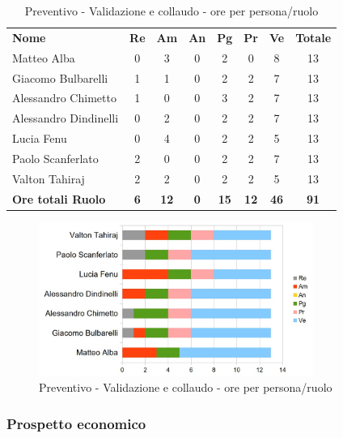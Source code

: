 		\begin{table} [h!]
			\begin{center}
				\begin{tabular} { m{3.5cm} c c c c c c c }
					\rowcolor{lightgray}
					\textbf{Nome} & \textbf{Re} & \textbf{Am} & \textbf{An} & \textbf{Pg} & \textbf{Pr} & \textbf{Ve} & \textbf{Totale} \\
					Matteo Alba & 0 & 3 & 0 & 2 & 0 & 8 & 13 \\
					Giacomo Bulbarelli & 1 & 1 & 0 & 2 & 2 & 7 & 13 \\
					Alessandro Chimetto & 1 & 0 & 0 & 3 & 2 & 7 & 13 \\
					Alessandro Dindinelli & 0 & 2 & 0 & 2 & 2 & 7 & 13 \\
					Lucia Fenu & 0 & 4 & 0 & 2 & 2 & 5 & 13 \\
					Paolo Scanferlato & 2 & 0 & 0 & 2 & 2 & 7 & 13 \\
					Valton Tahiraj & 2 & 2 & 0 & 2 & 2 & 5 & 13 \\
					\textbf{Ore totali Ruolo} & \textbf{6} & \textbf{12} & \textbf{0} & \textbf{15} & \textbf{12}& \textbf{46} & \textbf{91}
				\end{tabular}
				\caption{Preventivo - Validazione e collaudo - ore per persona/ruolo}
			\end{center}
		\end{table}
	
		\begin{figure} [h!]
			\centering
			\includegraphics[width=0.8\textwidth]{res/img/grafici/ValidazioneECollaudoOre.jpg}
			\caption{Preventivo - Validazione e collaudo - ore per persona/ruolo} 
		\end{figure}
	
	\newpage
	
	\subsubsection{Prospetto economico}
	
